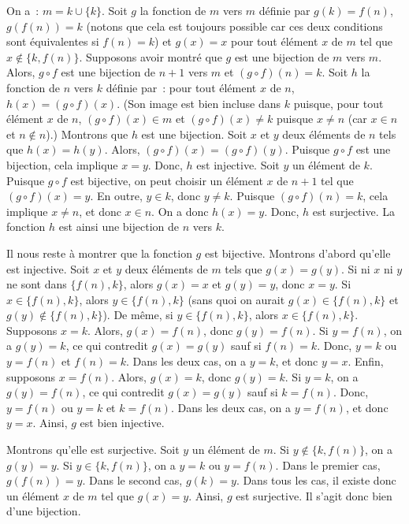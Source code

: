     On a : $m = k \cup \lbrace k \rbrace$. 
    Soit $g$ la fonction de $m$ vers $m$ définie par $g(k) = f(n)$, $g(f(n)) = k$ (notons que cela est toujours possible car ces deux conditions sont équivalentes si $f(n)=k$) et $g(x)=x$ pour tout élément $x$ de $m$ tel que $x \notin \lbrace k, f(n) \rbrace$. 
    Supposons avoir montré que $g$ est une bijection de $m$ vers $m$. 
    Alors, $g \circ f$ est une bijection de $n+1$ vers $m$ et $(g \circ f)(n) = k$. 
    Soit $h$ la fonction de $n$ vers $k$ définie par : pour tout élément $x$ de $n$, $h(x) = (g \circ f)(x)$. 
    (Son image est bien incluse dans $k$ puisque, pour tout élément $x$ de $n$, $(g \circ f)(x) \in m$ et $(g \circ f)(x) \neq k$ puisque $x \neq n$ (car $x \in n$ et $n \notin n$).)
    Montrons que $h$ est une bijection. 
    Soit $x$ et $y$ deux éléments de $n$ tels que $h(x)=h(y)$.
    Alors, $(g \circ f)(x) = (g \circ f)(y)$.
    Puisque  $g \circ f$ est une bijection, cela implique $x=y$.
    Donc, $h$ est injective. 
    Soit $y$ un élément de $k$. 
    Puisque $g \circ f$ est bijective, on peut choisir un élément $x$ de $n+1$ tel que $(g \circ f)(x) = y$. 
    En outre, $y \in k$, donc $y \neq k$. 
    Puisque $(g \circ f)(n)=k$, cela implique $x \neq n$, et donc $x \in n$. 
    On a donc $h(x) = y$. 
    Donc, $h$ est surjective.
    La fonction $h$ est ainsi une bijection de $n$ vers $k$.

    Il nous reste à montrer que la fonction $g$ est bijective. 
    Montrons d'abord qu'elle est injective. 
    Soit $x$ et $y$ deux éléments de $m$ tels que $g(x) = g(y)$.
    Si ni $x$ ni $y$ ne sont dans $\lbrace f(n), k \rbrace$, alors $g(x) = x$ et $g(y) = y$, donc $x=y$. 
    Si $x \in \lbrace f(n), k \rbrace$, alors $y \in \lbrace f(n), k \rbrace$ (sans quoi on aurait $g(x) \in \lbrace f(n), k \rbrace$ et $g(y) \notin \lbrace f(n), k \rbrace$). 
    De même, si $y \in \lbrace f(n), k \rbrace$, alors $x \in \lbrace f(n), k \rbrace$. 
    Supposons $x = k$. 
    Alors, $g(x) = f(n)$, donc $g(y) = f(n)$. 
    Si $y = f(n)$, on a $g(y) = k$, ce qui contredit $g(x) = g(y)$ sauf si $f(n) = k$. 
    Donc, $y = k$ ou $y = f(n)$ et $f(n) = k$. 
    Dans les deux cas, on a $y = k$, et donc $y = x$. 
    Enfin, supposons $x = f(n)$. 
    Alors, $g(x) = k$, donc $g(y) = k$. 
    Si $y = k$, on a $g(y) = f(n)$, ce qui contredit $g(x) = g(y)$ sauf si $k = f(n)$. 
    Donc, $y = f(n)$ ou $y = k$ et $k = f(n)$. 
    Dans les deux cas, on a $y = f(n)$, et donc $y = x$. 
    Ainsi, $g$ est bien injective. 

    Montrons qu'elle est surjective. 
    Soit $y$ un élément de $m$. 
    Si $y \notin \lbrace k, f(n) \rbrace$, on a $g(y) = y$. 
    Si $y \in \lbrace k, f(n) \rbrace$, on a $y = k$ ou $y = f(n)$. 
    Dans le premier cas, $g(f(n)) = y$. 
    Dans le second cas, $g(k) = y$. 
    Dans tous les cas, il existe donc un élément $x$ de $m$ tel que $g(x) = y$. 
    Ainsi, $g$ est surjective. 
    Il s'agit donc bien d'une bijection. 

